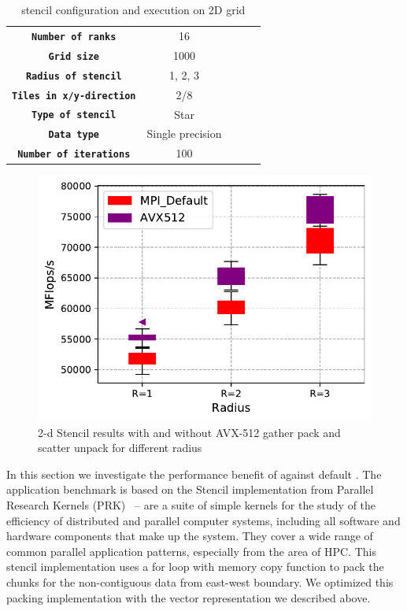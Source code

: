 \documentclass[conference]{IEEEtran}
\begin{document}
\begin{table}[h]
  \centering
  \caption{\mpi stencil configuration and execution on 2D grid}\label{tab:ewconfig}
  \small
  \begin{tabular}{cclll}
    \toprule
    \midrule
      \texttt{\bf Number of ranks} & 16 \\
      \texttt{\bf Grid size} & 1000 \\
      \texttt{\bf Radius of stencil} & 1, 2, 3 \\
      \texttt{\bf Tiles in x/y-direction} & 2/8 \\
      \texttt{\bf Type of stencil} & Star \\
      \texttt{\bf Data type} & Single precision \\
      \texttt{\bf Number of iterations} & 100 \\
      \bottomrule
  \end{tabular}
\end{table}

\begin{figure}[h]
    \centering
    \includegraphics[width=\linewidth]{stencil_diff_radius.pdf}
    \caption{2-d Stencil results with and without AVX-512 gather pack and scatter unpack for different radius}
    \label{fig:stencil_diff_radius}
\end{figure}

In this section we investigate the performance benefit of \ourwork against default \ompi.
The application benchmark is based on the Stencil \mpi implementation from Parallel
Research Kernels (PRK)~\cite{mpistencil,PRK2014} -- are a suite of simple kernels for the study of the efficiency
of distributed and parallel computer systems, including all software and hardware components that make up the system.
They cover a wide range of common parallel application patterns, especially from the area of HPC.
This stencil implementation uses a for loop with memory copy function to pack the chunks for the non-contiguous data from east-west boundary.
We optimized this packing implementation with the vector representation we described above.
\end{document}

